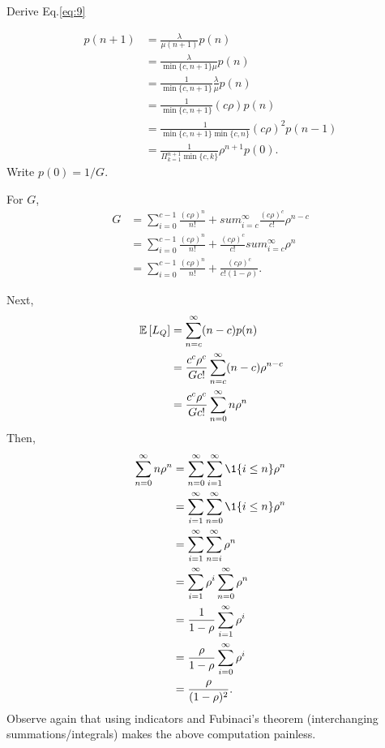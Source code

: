 \begin{question}
  Derive Eq.\eqref{eq:9}
  \begin{solution}
    \begin{equation*}
      \begin{split}
       p(n+1) 
&= \frac{\lambda}{\mu(n+1)}p(n) \\
&= \frac{\lambda}{\min\{c, n+1\} \mu }p(n) \\
&= \frac{1}{\min\{c, n+1\}}\frac\lambda\mu p(n) \\
&= \frac{1}{\min\{c, n+1\}}(c\rho) p(n) \\
&= \frac{1}{\min\{c, n+1\}\min\{c, n\}}(c\rho)^2 p(n-1) \\
&= \frac{1}{\Pi_{k=1}^{n+1}\min\{c, k\}}\rho^{n+1} p(0).
      \end{split}
    \end{equation*}
Write $p(0) = 1/G$.  

For  $G$, 
\begin{equation*}
  \begin{split}
  G 
&= 
\sum_{i=0}^{c-1}\frac{(c\rho)^n}{n!} + 
 sum_{i=c}^{\infty} \frac{(c\rho)^c}{c!} \rho^{n-c} \\
&= 
\sum_{i=0}^{c-1}\frac{(c\rho)^n}{n!} + 
\frac{(c\rho)^c}{c!} sum_{i=c}^{\infty} \rho^n \\
&= 
\sum_{i=0}^{c-1}\frac{(c\rho)^n}{n!} + 
\frac{(c\rho)^c}{c!(1-\rho)}.
  \end{split}
\end{equation*}

Next, 
\begin{equation*}
  \begin{split}
  \,\mathbb{E}\left[L_Q\right] 
&=\sum_{n=c}^\infty (n-c) p(n) \\
&=\frac{c^c\rho^c}{Gc!} \sum_{n=c}^\infty (n-c) \rho^{n-c} \\
&=\frac{c^c\rho^c}{Gc!} \sum_{n=0}^\infty n \rho^n \\
  \end{split}
\end{equation*}
Then, 
\begin{equation*}
  \begin{split}
  \sum_{n=0}^\infty n \rho^n 
&= \sum_{n=0}^\infty \sum_{i=1}^\infty \1{i\leq n} \rho^n\\
&= \sum_{i=1}^\infty   \sum_{n=0}^\infty \1{i\leq n} \rho^n\\
&= \sum_{i=1}^\infty   \sum_{n=i}^\infty \rho^n\\
&= \sum_{i=1}^\infty   \rho^i \sum_{n=0}^\infty \rho^n\\
&= \frac1{1-\rho} \sum_{i=1}^\infty   \rho^i \\
&= \frac\rho{1-\rho} \sum_{i=0}^\infty   \rho^i \\
&= \frac\rho{(1-\rho)^2}.
  \end{split}
\end{equation*}
Observe again that using indicators and Fubinaci's theorem
(interchanging summations/integrals) makes the above computation
painless.


\end{solution}
\end{question}
